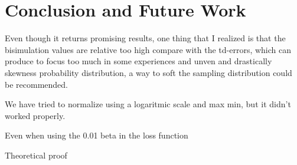 
\chapter{Conclusion and Future Work}

Even though it returns promising results, one thing that I realized is that the bisimulation values are relative too high compare with the td-errors, which can produce to focus too much in some experiences and unven and drastically skewness probability distribution, a way to soft the sampling distribution could be recommended. 

We have tried to normalize using a logaritmic scale and max min, but it didn't worked properly.

Even when using the 0.01 beta in the loss function

Theoretical proof







